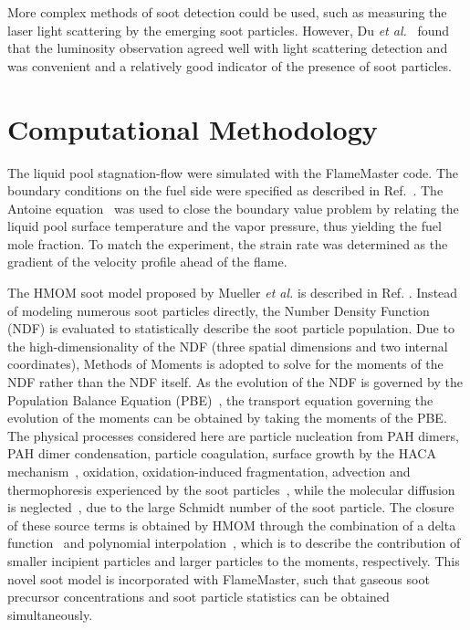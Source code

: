 \documentclass[preprint,3p,times,twocolumn]{elsarticleUS}
\begin{document}
More complex methods of soot detection could be used, such as measuring the laser light scattering by the emerging soot particles. However, Du \emph{et al.}~\cite{du89} found that the luminosity observation agreed well with light scattering detection and was convenient and a relatively good indicator of the presence of soot particles.



\section{Computational Methodology}

The liquid pool stagnation-flow were simulated with the FlameMaster code. The boundary conditions on the fuel side were specified as described in Ref.~\cite{buipham91}. The Antoine equation~\cite{polingbook} was used to close the boundary value problem by relating the liquid pool surface temperature and the vapor pressure, thus yielding the fuel mole fraction. To match the experiment, the strain rate was determined as the gradient of the velocity profile ahead of the flame.

The HMOM soot model proposed by Mueller \emph{et al.} is described in Ref. \cite{mueller09a,mueller09b,mueller11a}. Instead of modeling numerous soot particles directly, the Number Density Function (NDF) is evaluated to statistically describe the soot particle population. Due to the high-dimensionality of the NDF (three spatial dimensions and two internal coordinates), Methods of Moments is adopted to solve for the moments of the NDF rather than the NDF itself. As the evolution of the NDF is governed by the Population Balance Equation (PBE)~\cite{friedlander00}, the transport equation governing the evolution of the moments can be obtained by taking the moments of the PBE. The physical processes considered here are particle nucleation from PAH dimers, PAH dimer condensation, particle coagulation, surface growth by the HACA mechanism~\cite{frenklach02,frenklach91}, oxidation, oxidation-induced fragmentation, advection and thermophoresis experienced by the soot particles~\cite{waldmann66}, while the molecular diffusion is neglected~\cite{bisetti11}, due to the large Schmidt number of the soot particle. The closure of these source terms is obtained by HMOM through the combination of a delta function~\cite{marchisio05} and polynomial interpolation~\cite{frenklach87}, which is to describe the contribution of smaller incipient particles and larger particles to the moments, respectively. This novel soot model is incorporated with FlameMaster, such that gaseous soot precursor concentrations and soot particle statistics can be obtained simultaneously.
\end{document}
